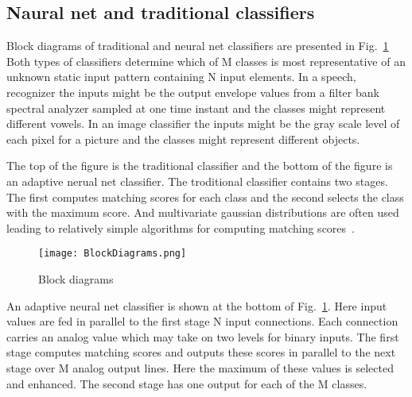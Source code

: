 \documentclass[10pt,twocolumn,letterpaper]{article}
\begin{document}
\subsection{Naural net and traditional classifiers}
\par Block diagrams of traditional and neural net classifiers are presented in Fig.~\ref{block} Both types of classifiers determine which of M classes is most representative of an unknown static input pattern containing N input elements. In a speech, recognizer the inputs might be the output envelope values from a filter bank spectral analyzer sampled at one time instant and the classes might represent different vowels. In an image classifier the inputs might be the gray scale level of each pixel for a picture and the classes might represent different objects.
\par The top of the figure is the traditional classifier and the bottom of the figure is an adaptive nerual net classifier. The troditional classifier contains two stages. The first computes matching scores for each class and the second selects the class with the maximum score. And multivariate gaussian distributions are often used leading to relatively simple algorithms for computing matching scores~\cite{elman1988learning}.
 \begin{figure}[htbp]
 \centering{}
\texttt{[image: BlockDiagrams.png]}\\
 \caption{Block diagrams}
\label{block}
\end{figure}
\par An adaptive neural net classifier is shown at the bottom of Fig.~\ref{block}. Here input values are fed in parallel to the first stage N input connections. Each connection carries an analog value which may take on two levels for binary inputs. The first stage computes matching scores and outputs these scores in parallel to the next stage over M analog output lines. Here the maximum of these values is selected and enhanced. The second stage has one output for each of the M classes.
\end{document}
